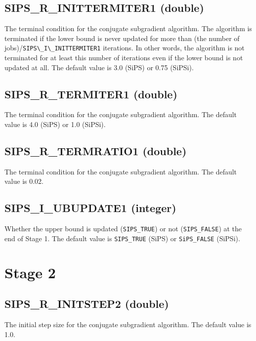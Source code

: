 \documentclass[a4paper]{book}
\begin{document}
\hypertarget{INITTERMITER1}{%
\subsection{SIPS\_R\_INITTERMITER1 (double)}
}

The terminal condition for the conjugate subgradient algorithm.
The algorithm is terminated if the lower bound is never updated for more than (the number of jobs)/\verb+SIPS\_I\_INITTERMITER1+ iterations.
In other words, the algorithm is not terminated for at least this number of iterations even if the lower bound is not updated at all.
The default value is 3.0 (SiPS) or 0.75 (SiPSi).

\hypertarget{TERMITER1}{%
\subsection{SIPS\_R\_TERMITER1 (double)}
}

The terminal condition for the conjugate subgradient algorithm.
The default value is 4.0 (SiPS) or 1.0 (SiPSi).

\hypertarget{TERMRATIO1}{%
\subsection{SIPS\_R\_TERMRATIO1 (double)}
}

The terminal condition for the conjugate subgradient algorithm.
The default value is 0.02.

\hypertarget{UBUPDATE1}{%
\subsection{SIPS\_I\_UBUPDATE1 (integer)}
}

Whether the upper bound is updated (\verb+SIPS_TRUE+) or not (\verb+SIPS_FALSE+) at the end of Stage 1.
The default value is \verb+SIPS_TRUE+ (SiPS) or \verb+SiPS_FALSE+ (SiPSi).

\section{Stage 2}

\hypertarget{INITSTEP2}{%
\subsection{SIPS\_R\_INITSTEP2 (double)}
}

The initial step size for the conjugate subgradient algorithm.
The default value is 1.0.
\end{document}

